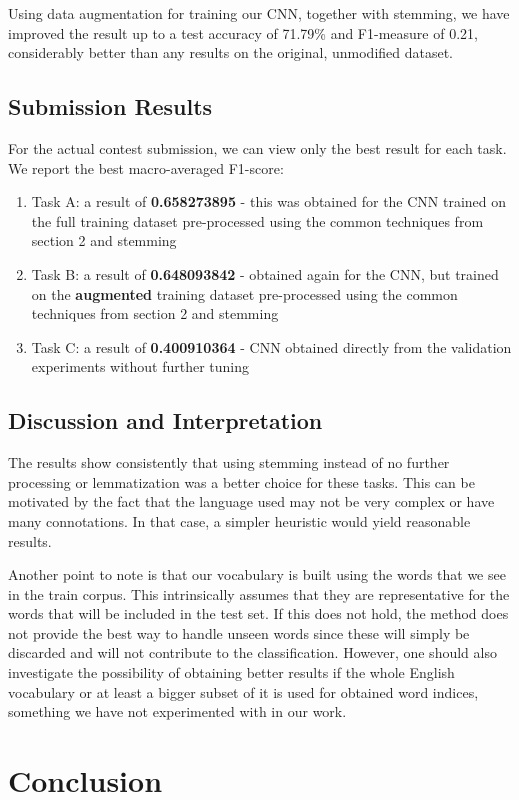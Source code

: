 \documentclass[11pt,a4paper]{article}
\begin{document}
Using data augmentation for training our CNN, together with stemming, we have improved the result up to a test accuracy of 71.79\% and F1-measure of 0.21, considerably better than any results on the original, unmodified dataset.


\subsection{Submission Results}

For the actual contest submission, we can view only the best result for each task. We report the best macro-averaged F1-score:

\begin{enumerate}
    \item Task A: a result of \textbf{0.658273895} - this was obtained for the CNN trained on the full training dataset pre-processed using the common techniques from section 2 and stemming
    \item Task B: a result of \textbf{0.648093842} - obtained again for the CNN, but trained on the \textbf{augmented} training dataset pre-processed using the common techniques from section 2 and stemming
    \item Task C: a result of \textbf{0.400910364} - CNN obtained directly from the validation experiments without further tuning
\end{enumerate}

\subsection{Discussion and Interpretation}

The results show consistently that using stemming instead of no further processing or lemmatization was a better choice for these tasks. This can be motivated by the fact that the language used may not be very complex or have many connotations. In that case, a simpler heuristic would yield reasonable results.

Another point to note is that our vocabulary is built using the words that we see in the train corpus. This intrinsically assumes that they are representative for the words that will be included in the test set. If this does not hold, the method does not provide the best way to handle unseen words since these will simply be discarded and will not contribute to the classification. However, one should also investigate the possibility of obtaining better results if the whole English vocabulary or at least a bigger subset of it is used for obtained word indices, something we have not experimented with in our work.

\section{Conclusion}



\end{document}

